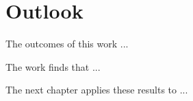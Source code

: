 

\section{Outlook}
The outcomes of this work ...

The work finds that ...

The next chapter applies these results to ...

